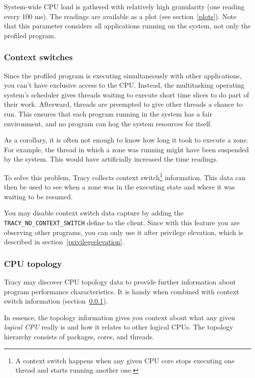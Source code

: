 \documentclass[hidelinks,titlepage,a4paper]{article}
\begin{document}
System-wide CPU load is gathered with relatively high granularity (one reading every 100 \si{\milli\second}). The readings are available as a plot (see section~\ref{plots}). Note that this parameter considers all applications running on the system, not only the profiled program.

\subsubsection{Context switches}
\label{contextswitches}

Since the profiled program is executing simultaneously with other applications, you can't have exclusive access to the CPU. Instead, the multitasking operating system's scheduler gives threads waiting to execute short time slices to do part of their work. Afterward, threads are preempted to give other threads a chance to run. This ensures that each program running in the system has a fair environment, and no program can hog the system resources for itself.

As a corollary, it is often not enough to know how long it took to execute a zone. For example, the thread in which a zone was running might have been suspended by the system. This would have artificially increased the time readings.

To solve this problem, Tracy collects context switch\footnote{A context switch happens when any given CPU core stops executing one thread and starts running another one.} information. This data can then be used to see when a zone was in the executing state and where it was waiting to be resumed.

You may disable context switch data capture by adding the \texttt{TRACY\_NO\_CONTEXT\_SWITCH} define to the client. Since with this feature you are observing other programs, you can only use it after privilege elevation, which is described in section~\ref{privilegeelevation}.

\subsubsection{CPU topology}
\label{cputopology}

Tracy may discover CPU topology data to provide further information about program performance characteristics. It is handy when combined with context switch information (section~\ref{contextswitches}).

In essence, the topology information gives you context about what any given \emph{logical CPU} really is and how it relates to other logical CPUs. The topology hierarchy consists of packages, cores, and threads.
\end{document}
